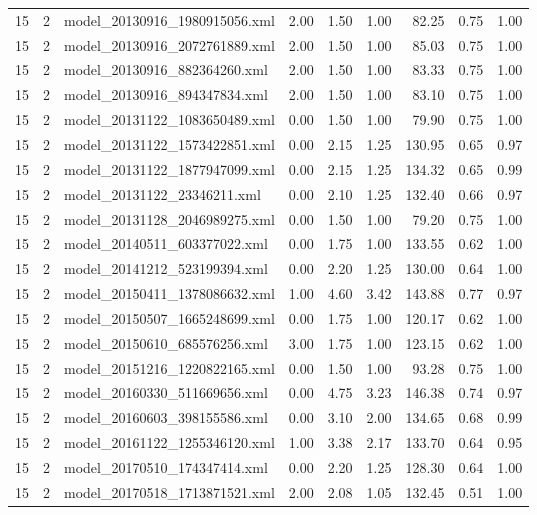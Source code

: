 \begin{table}[ht]
\begin{tabular}{rrlrrrrrr}
   15 &   2 & model\_20130916\_1980915056.xml & 2.00 & 1.50 & 1.00 & 82.25 & 0.75 & 1.00 \\ 
   15 &   2 & model\_20130916\_2072761889.xml & 2.00 & 1.50 & 1.00 & 85.03 & 0.75 & 1.00 \\ 
   15 &   2 & model\_20130916\_882364260.xml & 2.00 & 1.50 & 1.00 & 83.33 & 0.75 & 1.00 \\ 
   15 &   2 & model\_20130916\_894347834.xml & 2.00 & 1.50 & 1.00 & 83.10 & 0.75 & 1.00 \\ 
   15 &   2 & model\_20131122\_1083650489.xml & 0.00 & 1.50 & 1.00 & 79.90 & 0.75 & 1.00 \\ 
   15 &   2 & model\_20131122\_1573422851.xml & 0.00 & 2.15 & 1.25 & 130.95 & 0.65 & 0.97 \\ 
   15 &   2 & model\_20131122\_1877947099.xml & 0.00 & 2.15 & 1.25 & 134.32 & 0.65 & 0.99 \\ 
   15 &   2 & model\_20131122\_23346211.xml & 0.00 & 2.10 & 1.25 & 132.40 & 0.66 & 0.97 \\ 
   15 &   2 & model\_20131128\_2046989275.xml & 0.00 & 1.50 & 1.00 & 79.20 & 0.75 & 1.00 \\ 
   15 &   2 & model\_20140511\_603377022.xml & 0.00 & 1.75 & 1.00 & 133.55 & 0.62 & 1.00 \\ 
   15 &   2 & model\_20141212\_523199394.xml & 0.00 & 2.20 & 1.25 & 130.00 & 0.64 & 1.00 \\ 
   15 &   2 & model\_20150411\_1378086632.xml & 1.00 & 4.60 & 3.42 & 143.88 & 0.77 & 0.97 \\ 
   15 &   2 & model\_20150507\_1665248699.xml & 0.00 & 1.75 & 1.00 & 120.17 & 0.62 & 1.00 \\ 
   15 &   2 & model\_20150610\_685576256.xml & 3.00 & 1.75 & 1.00 & 123.15 & 0.62 & 1.00 \\ 
   15 &   2 & model\_20151216\_1220822165.xml & 0.00 & 1.50 & 1.00 & 93.28 & 0.75 & 1.00 \\ 
   15 &   2 & model\_20160330\_511669656.xml & 0.00 & 4.75 & 3.23 & 146.38 & 0.74 & 0.97 \\ 
   15 &   2 & model\_20160603\_398155586.xml & 0.00 & 3.10 & 2.00 & 134.65 & 0.68 & 0.99 \\ 
   15 &   2 & model\_20161122\_1255346120.xml & 1.00 & 3.38 & 2.17 & 133.70 & 0.64 & 0.95 \\ 
   15 &   2 & model\_20170510\_174347414.xml & 0.00 & 2.20 & 1.25 & 128.30 & 0.64 & 1.00 \\ 
   15 &   2 & model\_20170518\_1713871521.xml & 2.00 & 2.08 & 1.05 & 132.45 & 0.51 & 1.00 \\ 

\end{tabular}
\end{table}
